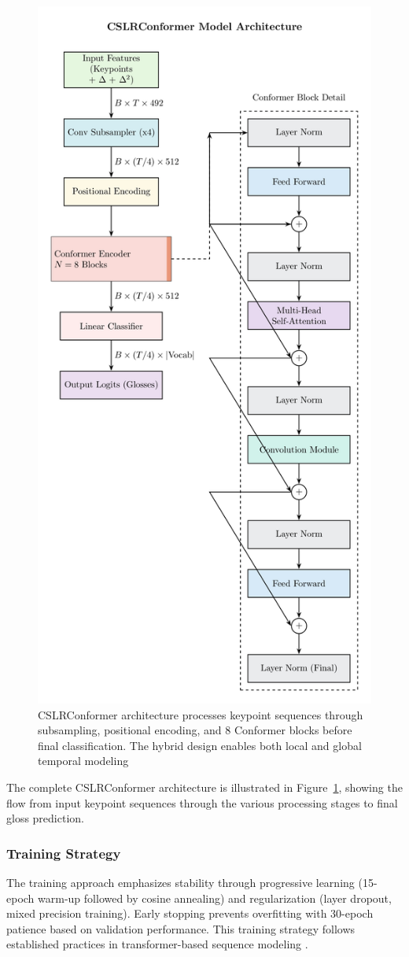 \begin{figure}
    \centering
    \includegraphics[width=0.75\linewidth]{model.jpg}
    \caption{CSLRConformer architecture processes keypoint sequences through subsampling, positional encoding, and 8 Conformer blocks before final classification. The hybrid design enables both local and global temporal modeling}
    \label{fig:cslr_conformer_architecture}
\end{figure}

The complete CSLRConformer architecture is illustrated in Figure~\ref{fig:cslr_conformer_architecture}, showing the flow from input keypoint sequences through the various processing stages to final gloss prediction.

\subsubsection{Training Strategy}
The training approach emphasizes stability through progressive learning (15-epoch warm-up followed by cosine annealing) and regularization (layer dropout, mixed precision training). Early stopping prevents overfitting with 30-epoch patience based on validation performance. This training strategy follows established practices in transformer-based sequence modeling \cite{gulati2020conformer}.